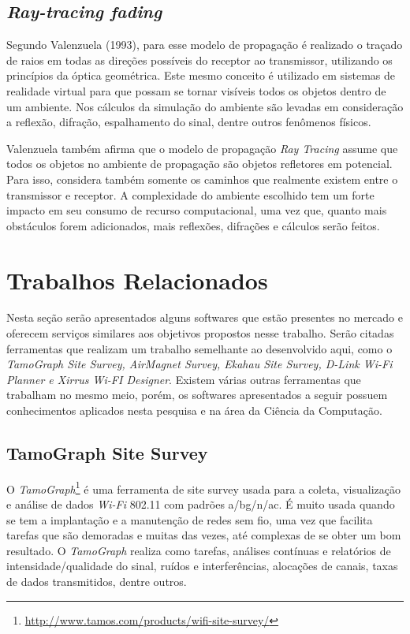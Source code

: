 \documentclass[
	12pt,				%
	openright,			%
	twoside,			%
	a4paper,			%
	english,			%
	french,				%
	spanish,			%
	brazil				%
	]{abntex2}
\begin{document}
\subsection[Ray-tracing fading]{\textit{Ray-tracing fading}}

Segundo Valenzuela (1993), para esse modelo de propagação é realizado o traçado de raios em todas as direções possíveis do receptor ao transmissor, utilizando os princípios da óptica geométrica. Este mesmo conceito é utilizado em sistemas de realidade virtual para que possam se tornar visíveis todos os objetos dentro de um ambiente. Nos cálculos da simulação do ambiente são levadas em consideração a reflexão, difração, espalhamento do sinal, dentre outros fenômenos físicos.
 
Valenzuela também afirma que o modelo de propagação \textit{Ray Tracing} assume que todos os objetos no ambiente de propagação são objetos refletores em potencial. Para isso, considera também somente os caminhos que realmente existem entre o transmissor e receptor. A complexidade do ambiente escolhido tem um forte impacto em seu consumo de recurso computacional, uma vez que, quanto mais obstáculos forem adicionados, mais reflexões, difrações e cálculos serão feitos.


\section[Trabalhos Relacionados]{Trabalhos Relacionados}

Nesta seção serão apresentados alguns softwares que estão presentes no mercado e oferecem serviços similares aos objetivos propostos nesse trabalho. Serão citadas ferramentas que realizam um trabalho semelhante ao desenvolvido aqui, como o \textit{TamoGraph Site Survey, AirMagnet Survey, Ekahau Site Survey, D-Link Wi-Fi Planner e Xirrus Wi-FI Designer}. Existem várias outras ferramentas que trabalham no mesmo meio, porém, os softwares apresentados a seguir possuem conhecimentos aplicados nesta pesquisa e na área da Ciência da Computação.

\subsection[TamoGraph Site Survey]{TamoGraph Site Survey}

O \textit{TamoGraph}\footnote{\url{http://www.tamos.com/products/wifi-site-survey/}} é uma ferramenta de site survey usada para a coleta, visualização e análise de dados \textit{Wi-Fi} 802.11 com padrões a/bg/n/ac. É muito usada quando se tem a implantação e a manutenção de redes sem fio, uma vez que facilita tarefas que são demoradas e muitas das vezes, até complexas de se obter um bom resultado. O \textit{TamoGraph} realiza como tarefas, análises contínuas e relatórios de intensidade/qualidade do sinal, ruídos e interferências, alocações de canais, taxas de dados transmitidos, dentre outros.
\end{document}
